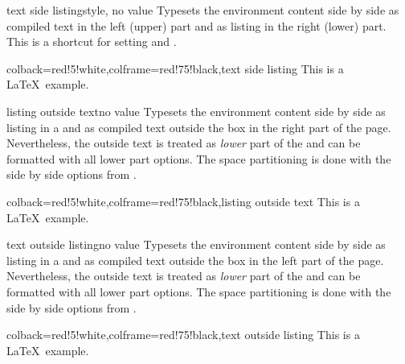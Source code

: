 \begin{docTcbKey}{text side listing}{}{style, no value}
Typesets the environment content side by side as compiled text in the left (upper)
part and as listing in the right (lower) part.
This is a shortcut for setting  and .
\begin{dispExample}
\begin{tcblisting}{colback=red!5!white,colframe=red!75!black,text side listing}
This is a \LaTeX\ example.
\end{tcblisting}
\end{dispExample}
\end{docTcbKey}


\begin{docTcbKey}{listing outside text}{}{no value}
Typesets the environment content side by side as listing in a 
and as compiled text outside the box in the right part of the page.
Nevertheless, the outside text is treated as \emph{lower} part of the
 and can be formatted with all lower part options.
The space partitioning is done with the side by side options from
.
\begin{dispExample}
\begin{tcblisting}{colback=red!5!white,colframe=red!75!black,listing outside text}
This is a \LaTeX\ example.
\end{tcblisting}
\end{dispExample}
\end{docTcbKey}

\clearpage

\begin{docTcbKey}{text outside listing}{}{no value}
Typesets the environment content side by side as listing in a 
and as compiled text outside the box in the left part of the page.
Nevertheless, the outside text is treated as \emph{lower} part of the
 and can be formatted with all lower part options.
The space partitioning is done with the side by side options from
.
\begin{dispExample}
\begin{tcblisting}{colback=red!5!white,colframe=red!75!black,text outside listing}
This is a \LaTeX\ example.
\end{tcblisting}
\end{dispExample}
\end{docTcbKey}



